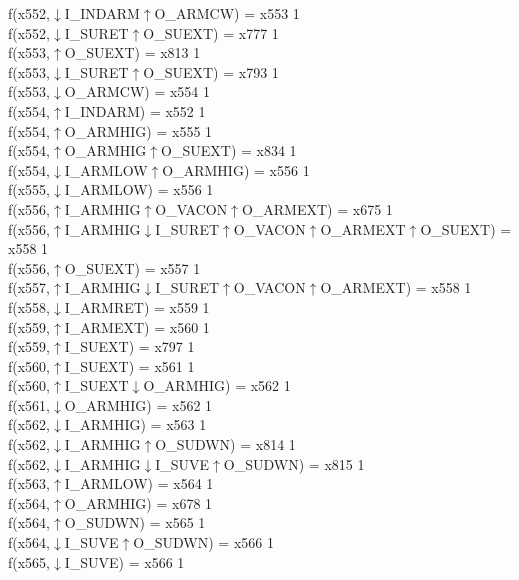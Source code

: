 f(x552,$\downarrow$I\_INDARM$\uparrow$O\_ARMCW) = x553 {1} \\
f(x552,$\downarrow$I\_SURET$\uparrow$O\_SUEXT) = x777 {1} \\
f(x553,$\uparrow$O\_SUEXT) = x813 {1} \\
f(x553,$\downarrow$I\_SURET$\uparrow$O\_SUEXT) = x793 {1} \\
f(x553,$\downarrow$O\_ARMCW) = x554 {1} \\
f(x554,$\uparrow$I\_INDARM) = x552 {1} \\
f(x554,$\uparrow$O\_ARMHIG) = x555 {1} \\
f(x554,$\uparrow$O\_ARMHIG$\uparrow$O\_SUEXT) = x834 {1} \\
f(x554,$\downarrow$I\_ARMLOW$\uparrow$O\_ARMHIG) = x556 {1} \\
f(x555,$\downarrow$I\_ARMLOW) = x556 {1} \\
f(x556,$\uparrow$I\_ARMHIG$\uparrow$O\_VACON$\uparrow$O\_ARMEXT) = x675 {1} \\
f(x556,$\uparrow$I\_ARMHIG$\downarrow$I\_SURET$\uparrow$O\_VACON$\uparrow$O\_ARMEXT$\uparrow$O\_SUEXT) = x558 {1} \\
f(x556,$\uparrow$O\_SUEXT) = x557 {1} \\
f(x557,$\uparrow$I\_ARMHIG$\downarrow$I\_SURET$\uparrow$O\_VACON$\uparrow$O\_ARMEXT) = x558 {1} \\
f(x558,$\downarrow$I\_ARMRET) = x559 {1} \\
f(x559,$\uparrow$I\_ARMEXT) = x560 {1} \\
f(x559,$\uparrow$I\_SUEXT) = x797 {1} \\
f(x560,$\uparrow$I\_SUEXT) = x561 {1} \\
f(x560,$\uparrow$I\_SUEXT$\downarrow$O\_ARMHIG) = x562 {1} \\
f(x561,$\downarrow$O\_ARMHIG) = x562 {1} \\
f(x562,$\downarrow$I\_ARMHIG) = x563 {1} \\
f(x562,$\downarrow$I\_ARMHIG$\uparrow$O\_SUDWN) = x814 {1} \\
f(x562,$\downarrow$I\_ARMHIG$\downarrow$I\_SUVE$\uparrow$O\_SUDWN) = x815 {1} \\
f(x563,$\uparrow$I\_ARMLOW) = x564 {1} \\
f(x564,$\uparrow$O\_ARMHIG) = x678 {1} \\
f(x564,$\uparrow$O\_SUDWN) = x565 {1} \\
f(x564,$\downarrow$I\_SUVE$\uparrow$O\_SUDWN) = x566 {1} \\
f(x565,$\downarrow$I\_SUVE) = x566 {1} \\
